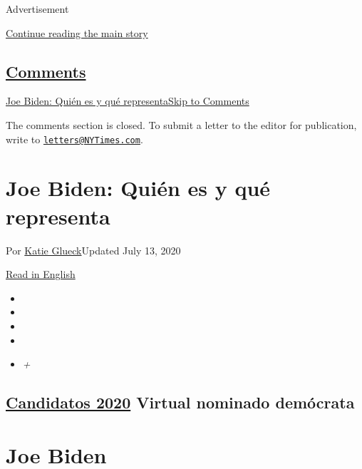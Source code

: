 Advertisement

\protect\hyperlink{after-top}{Continue reading the main story}

\hypertarget{comments}{%
\subsection{\texorpdfstring{\protect\hyperlink{commentsContainer}{Comments}}{Comments}}\label{comments}}

\href{}{Joe Biden: Quién es y qué representa}\href{}{Skip to Comments}

The comments section is closed. To submit a letter to the editor for
publication, write to
\href{mailto:letters@NYTimes.com}{\nolinkurl{letters@NYTimes.com}}.

\hypertarget{joe-biden-quiuxe9n-es-y-quuxe9-representa}{%
\section{Joe Biden: Quién es y qué
representa}\label{joe-biden-quiuxe9n-es-y-quuxe9-representa}}

Por \href{https://www.nytimes3xbfgragh.onion/by/katie-glueck}{Katie
Glueck}Updated July 13, 2020

\href{https://www.nytimes3xbfgragh.onion/interactive/2020/us/elections/joe-biden.html}{Read
in English}

\begin{itemize}
\item
\item
\item
\item
\item
  \emph{+}
\end{itemize}

\hypertarget{candidatos-2020--virtual-nominado-demuxf3crata-}{%
\subsection{\texorpdfstring{\href{https://www.nytimes3xbfgragh.onion/interactive/2019/us/politics/2020-presidential-candidates.html}{Candidatos
2020} Virtual nominado demócrata
}{Candidatos 2020  Virtual nominado demócrata }}\label{candidatos-2020--virtual-nominado-demuxf3crata-}}

\hypertarget{joe-biden}{%
\section{Joe Biden}\label{joe-biden}}

